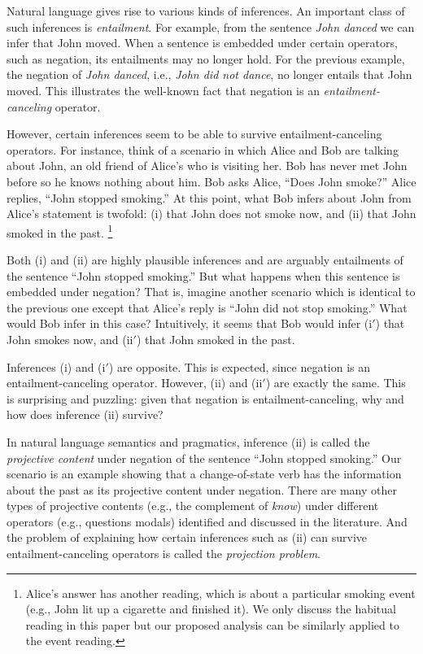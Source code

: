 Natural language gives rise to various kinds of inferences. 
An important class of such inferences is \emph{entailment}. 
For example, from the sentence \emph{John danced} we can infer 
 that John moved. 
When a sentence is embedded under certain operators, such as negation, 
 its entailments may no longer hold. 
For the previous example, the negation of \emph{John danced}, i.e., 
 \emph{John did not dance}, no longer entails that John moved.
This illustrates the well-known fact that negation is an
 \emph{entailment-canceling} operator.

However, certain inferences seem to be able to survive entailment-canceling operators.
For instance, think of a scenario in which Alice and Bob are talking about John, 
 an old friend of Alice's who is visiting her. 
Bob has never met John before so he knows nothing about him. 
Bob asks Alice, ``Does John smoke?'' 
Alice replies, ``John stopped smoking.'' 
At this point, what Bob infers about John from Alice's statement is twofold: 
 (i) that John does not smoke now, and (ii) that John smoked in the past.%
\footnote{Alice's answer has another reading, which is about a particular smoking event 
 (e.g., John lit up a cigarette and finished it).
We only discuss the habitual reading in this paper but our proposed analysis can be similarly 
 applied to the event reading.}
 
Both (i) and (ii) are highly plausible inferences and are arguably entailments of
 the sentence ``John stopped smoking.''
But what happens when this sentence is embedded under negation? 
That is, imagine another scenario which is identical to the previous one except that 
 Alice's reply is ``John did not stop smoking.'' 
What would Bob infer in this case?
Intuitively, it seems that Bob would infer (i$'$) that John smokes now, 
 and (ii$'$) that John smoked in the past.
 
Inferences (i) and (i$'$) are opposite.
This is expected, since negation is an entailment-canceling operator.
However, (ii) and (ii$'$) are exactly the same.
This is surprising and puzzling: given that negation is entailment-canceling, 
 why and how does inference (ii) survive?
 
In natural language semantics and pragmatics, inference (ii) is called the
 \emph{projective content} under negation of the sentence ``John stopped smoking.'' 
Our scenario is an example showing that a change-of-state verb has 
 the information about the past as its projective content under negation. 
There are many other types of projective contents 
 (e.g., the complement of \emph{know}) under different operators 
 (e.g., questions modals) identified and discussed in the literature. 
And the problem of explaining how certain inferences such as (ii) can
 survive entailment-canceling operators is called the \emph{projection problem}.

